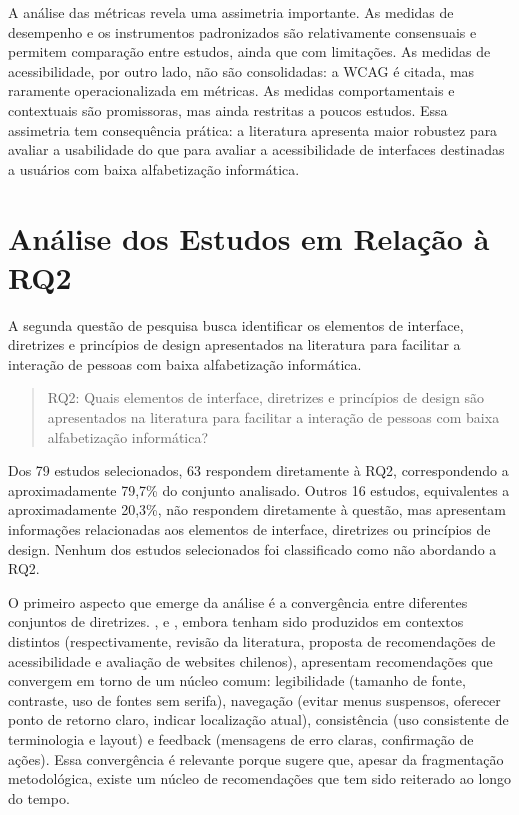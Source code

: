 A análise das métricas revela uma assimetria importante. As medidas de desempenho e os instrumentos padronizados são relativamente consensuais e permitem comparação entre estudos, ainda que com limitações. As medidas de acessibilidade, por outro lado, não são consolidadas: a WCAG é citada, mas raramente operacionalizada em métricas. As medidas comportamentais e contextuais são promissoras, mas ainda restritas a poucos estudos. Essa assimetria tem consequência prática: a literatura apresenta maior robustez para avaliar a usabilidade do que para avaliar a acessibilidade de interfaces destinadas a usuários com baixa alfabetização informática.


\section{Análise dos Estudos em Relação à RQ2}

A segunda questão de pesquisa busca identificar os elementos de interface, diretrizes e princípios de design apresentados na literatura para facilitar a interação de pessoas com baixa alfabetização informática.

\begin{quote}

RQ2: Quais elementos de interface, diretrizes e princípios de design são apresentados na literatura para facilitar a interação de pessoas com baixa alfabetização informática?

\end{quote}

Dos 79 estudos selecionados, 63 respondem diretamente à RQ2, correspondendo a aproximadamente 79,7\% do conjunto analisado. Outros 16 estudos, equivalentes a aproximadamente 20,3\%, não respondem diretamente à questão, mas apresentam informações relacionadas aos elementos de interface, diretrizes ou princípios de design. Nenhum dos estudos selecionados foi classificado como não abordando a RQ2.

O primeiro aspecto que emerge da análise é a convergência entre diferentes conjuntos de diretrizes. \cite{kurniawan2005research}, \cite{sun2010preliminary} e \cite{dombrovskaia2021guideline}, embora tenham sido produzidos em contextos distintos (respectivamente, revisão da literatura, proposta de recomendações de acessibilidade e avaliação de websites chilenos), apresentam recomendações que convergem em torno de um núcleo comum: legibilidade (tamanho de fonte, contraste, uso de fontes sem serifa), navegação (evitar menus suspensos, oferecer ponto de retorno claro, indicar localização atual), consistência (uso consistente de terminologia e layout) e feedback (mensagens de erro claras, confirmação de ações). Essa convergência é relevante porque sugere que, apesar da fragmentação metodológica, existe um núcleo de recomendações que tem sido reiterado ao longo do tempo.

